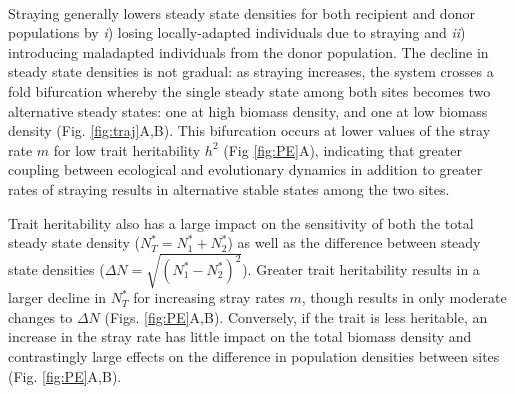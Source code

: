 \documentclass[twocolumn,preprintnumbers,amsmath,amssymb,superscriptaddress]{revtex4}
\begin{document}




 \\
\noindent Straying generally lowers steady state densities for both recipient and donor populations by \emph{i}) losing locally-adapted individuals due to straying and \emph{ii}) introducing maladapted individuals from the donor population. %
The decline in steady state densities is not gradual: as straying increases, the system crosses a fold bifurcation whereby the single steady state among both sites becomes two alternative steady states: one at high biomass density, and one at low biomass density (Fig. \ref{fig:traj}A,B).
This bifurcation occurs at lower values of the stray rate $m$ for low trait heritability $h^2$ (Fig \ref{fig:PE}A), indicating that greater coupling between ecological and evolutionary dynamics in addition to greater rates of straying results in alternative stable states among the two sites.

Trait heritability also has a large impact on the sensitivity of both the total steady state density ($N^*_T=N^*_1+N^*_2$) as well as the difference between steady state densities ($\Delta N=\sqrt{(N^*_1-N^*_2)^2}$).
Greater trait heritability results in a larger decline in $N_T^*$ for increasing stray rates $m$, though results in only moderate changes to $\Delta N$ (Figs. \ref{fig:PE}A,B).
Conversely, if the trait is less heritable, an increase in the stray rate has little impact on the total biomass density and contrastingly large effects on the difference in population densities between sites (Fig. \ref{fig:PE}A,B).
\end{document}

